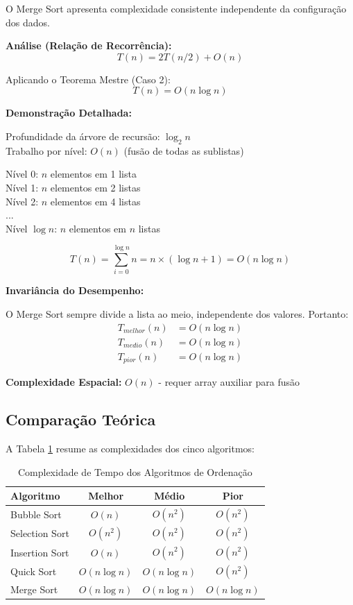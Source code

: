 \documentclass[conference]{IEEEtran}
\begin{document}
O Merge Sort apresenta complexidade consistente independente da configuração dos dados.

\textbf{Análise (Relação de Recorrência):}
\begin{equation}
T(n) = 2T(n/2) + O(n)
\end{equation}

Aplicando o Teorema Mestre (Caso 2):
\begin{equation}
T(n) = O(n \log n)
\end{equation}

\textbf{Demonstração Detalhada:}

Profundidade da árvore de recursão: $\log_2 n$\\
Trabalho por nível: $O(n)$ (fusão de todas as sublistas)

Nível 0: $n$ elementos em 1 lista\\
Nível 1: $n$ elementos em 2 listas\\
Nível 2: $n$ elementos em 4 listas\\
...\\
Nível $\log n$: $n$ elementos em $n$ listas

\begin{equation}
T(n) = \sum_{i=0}^{\log n} n = n \times (\log n + 1) = O(n \log n)
\end{equation}

\textbf{Invariância do Desempenho:}

O Merge Sort sempre divide a lista ao meio, independente dos valores. Portanto:
\begin{align}
T_{melhor}(n) &= O(n \log n) \\
T_{medio}(n) &= O(n \log n) \\
T_{pior}(n) &= O(n \log n)
\end{align}

\textbf{Complexidade Espacial:} $O(n)$ - requer array auxiliar para fusão

\subsection{Comparação Teórica}

A Tabela \ref{tab:complexidade} resume as complexidades dos cinco algoritmos:

\begin{table}[h]
\centering
\caption{Complexidade de Tempo dos Algoritmos de Ordenação}
\label{tab:complexidade}
\renewcommand{\arraystretch}{1.3}
\begin{tabular}{|l|c|c|c|}
\hline
\textbf{Algoritmo} & \textbf{Melhor} & \textbf{Médio} & \textbf{Pior} \\
\hline
Bubble Sort & $O(n)$ & $O(n^2)$ & $O(n^2)$ \\
Selection Sort & $O(n^2)$ & $O(n^2)$ & $O(n^2)$ \\
Insertion Sort & $O(n)$ & $O(n^2)$ & $O(n^2)$ \\
Quick Sort & $O(n \log n)$ & $O(n \log n)$ & $O(n^2)$ \\
Merge Sort & $O(n \log n)$ & $O(n \log n)$ & $O(n \log n)$ \\
\hline
\end{tabular}
\end{table}
\end{document}
